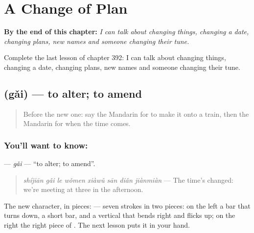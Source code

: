 
\chapter{A Change of Plan}
\label{ch:zh-a-change-of-plan}

\begin{chapteropening}
\textbf{By the end of this chapter:} \emph{I can talk about changing things, changing a date, changing plans, new names and someone changing their tune.}

Complete the last lesson of chapter 392: I can talk about changing things, changing a date, changing plans, new names and someone changing their tune.
\end{chapteropening}

\section[\texorpdfstring{\zh{改} (gǎi)}{改 (gǎi)}]{ (gǎi) — to alter; to amend}

\label{lesson:ZH-C392-gai}



\begin{quote}
Before the new one: say the Mandarin for to make it onto a train, then the Mandarin for when the time comes.
\end{quote}

\subsection*{You'll want to know: }
\textbf{} — \emph{gǎi} — \textquotedblleft{}to alter; to amend\textquotedblright{}.

\begin{quote}
\textbf{} \emph{shíjiān gǎi le wǒmen xiàwǔ sān diǎn jiànmiàn} — The time's changed: we're meeting at three in the afternoon.
\end{quote}

The new character, in pieces:  — seven strokes in two pieces: on the left a bar that turns down, a short bar, and a vertical that bends right and flicks up; on the right the right piece of . The next lesson puts it in your hand.

